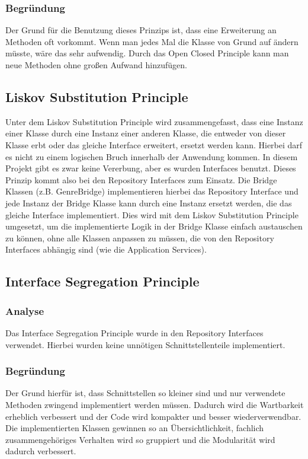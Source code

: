        \subsubsection{Begründung}
        Der Grund für die Benutzung dieses Prinzips ist, dass eine Erweiterung an Methoden oft vorkommt. Wenn man jedes Mal die Klasse von Grund auf ändern müsste, wäre das sehr aufwendig. Durch das Open Closed Principle kann man neue Methoden ohne großen Aufwand hinzufügen.

    \subsection{Liskov Substitution Principle}
        Unter dem Liskov Substitution Principle wird zusammengefasst, dass eine Instanz einer Klasse durch eine Instanz einer anderen Klasse, die entweder von dieser Klasse erbt oder das gleiche Interface erweitert, ersetzt werden kann. Hierbei darf es nicht zu einem logischen Bruch innerhalb der Anwendung kommen. In diesem Projekt gibt es zwar keine Vererbung, aber es wurden Interfaces benutzt. Dieses Prinzip kommt also bei den Repository Interfaces zum Einsatz. Die Bridge Klassen (z.B. GenreBridge) implementieren hierbei das Repository Interface und jede Instanz der Bridge Klasse kann durch eine Instanz ersetzt werden, die das gleiche Interface implementiert. Dies wird mit dem Liskov Substitution Principle umgesetzt, um die implementierte Logik in der Bridge Klasse einfach austauschen zu können, ohne alle Klassen anpassen zu müssen, die von den Repository Interfaces abhängig sind (wie die Application Services).

    \subsection{Interface Segregation Principle}
    
        \subsubsection{Analyse}
        Das Interface Segregation Principle wurde in den Repository Interfaces verwendet. Hierbei wurden keine unnötigen Schnittstellenteile implementiert.
        
        \subsubsection{Begründung}
        Der Grund hierfür ist, dass Schnittstellen so kleiner sind und nur verwendete Methoden zwingend implementiert werden müssen. Dadurch wird die Wartbarkeit erheblich verbessert und der Code wird kompakter und besser wiederverwendbar. Die implementierten Klassen gewinnen so an Übersichtlichkeit, fachlich zusammengehöriges Verhalten wird so gruppiert und die Modularität wird dadurch verbessert.

